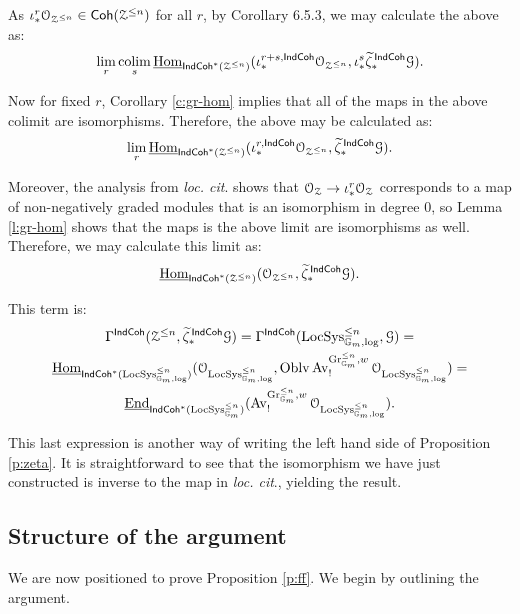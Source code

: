 \documentclass[reqno,11pt]{amsart}
\numberwithin{equation}{subsection}
\theoremstyle{remark}
\newcommand{\bG}{{\mathbb G}}
\newcommand{\sG}{{\EuScript G}}
\newcommand{\sO}{{\EuScript O}}
\newcommand{\sZ}{{\EuScript Z}}
\newcommand{\on}{\operatorname}
\newcommand{\ul}{\underline}
\newcommand{\End}{\on{End}}
\newcommand{\Hom}{\on{Hom}}
\newcommand{\Gr}{\on{Gr}}
\newcommand{\LocSys}{\on{LocSys}}
\newcommand{\colim}{\on{colim}}
\renewcommand{\lim}{\on{lim}}
\newcommand{\Oblv}{\on{Oblv}}
\newcommand{\Av}{\on{Av}}
\newcommand{\Coh}{\mathsf{Coh}}
\newcommand{\IndCoh}{\mathsf{IndCoh}}
\begin{document}
\noindent As $\iota_*^r \sO_{\sZ^{\leq n}} \in \Coh(\sZ^{\leq n})$ for all $r$,
by \cite{cpsii} Corollary 6.5.3, we may calculate the above as:
%
\[
\underset{r}{\lim} \, 
\underset{s}{\colim} \, 
\ul{\Hom}_{\IndCoh^*(\sZ^{\leq n})}
(\iota_*^{r+s,\IndCoh} \sO_{\sZ^{\leq n}},
\iota_*^s\widetilde{\zeta}_*^{\,\IndCoh}\sG).
\]

Now for fixed $r$, Corollary \ref{c:gr-hom} implies that all of the
maps in the above colimit are isomorphisms. Therefore, the above
may be calculated as:
%
\[
\underset{r}{\lim} \, 
\ul{\Hom}_{\IndCoh^*(\sZ^{\leq n})}
(\iota_*^{r,\IndCoh} \sO_{\sZ^{\leq n}},
\widetilde{\zeta}_*^{\,\IndCoh}\sG).
\]

\noindent Moreover, the analysis from \emph{loc. cit}. shows that
$\sO_{\sZ} \to \iota_*^r\sO_{\sZ}$ corresponds to a map of
non-negatively graded modules that is an isomorphism in degree $0$, 
so Lemma \ref{l:gr-hom} shows that the maps is the above
limit are isomorphisms as well. Therefore, we may calculate this
limit as:
%
\begin{equation}\label{eq:no-r-s}
\ul{\Hom}_{\IndCoh^*(\sZ^{\leq n})}
(\sO_{\sZ^{\leq n}},
\widetilde{\zeta}_*^{\,\IndCoh}\sG).
\end{equation}

\noindent This term is:
%
\[
\begin{gathered}
\Gamma^{\IndCoh}(\sZ^{\leq n},\widetilde{\zeta}_*^{\,\IndCoh}\sG) = 
\Gamma^{\IndCoh}(\LocSys_{\bG_m,\log}^{\leq n},\sG) = \\
\ul{\Hom}_{\IndCoh^*(\LocSys_{\bG_m,\log}^{\leq n})}
(\sO_{\LocSys_{\bG_m,\log}^{\leq n}},\Oblv\Av_!^{\Gr_{\bG_m}^{\leq n},w} 
\sO_{\LocSys_{\bG_m,\log}^{\leq n}}) = \\ 
\ul{\End}_{\IndCoh^*(\LocSys_{\bG_m}^{\leq n})}
(\Av_!^{\Gr_{\bG_m}^{\leq n},w} 
\sO_{\LocSys_{\bG_m,\log}^{\leq n}}).
\end{gathered}
\]

\noindent This last expression is another way of writing the left hand side
of Proposition \ref{p:zeta}. It is straightforward to see that the isomorphism
we have just constructed is inverse to the map in \emph{loc. cit}., yielding the result.


\subsection{Structure of the argument}

We are now positioned to prove Proposition \ref{p:ff}.
We begin by outlining the argument.
\end{document}
